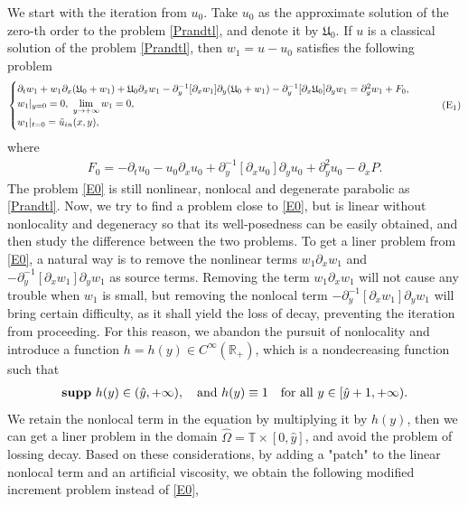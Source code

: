 \documentclass{amsart}
\numberwithin{equation}{section}
\begin{document}
We start with the iteration from $u_{0}$. Take $u_{0}$ as the approximate solution of the zero-th order to the problem \eqref{Prandtl}, and denote it by $\mathfrak{U}_{0}$. If $u$ is a classical solution of the problem \eqref{Prandtl}, then $w_{1}=u-u_{0}$ satisfies the following problem
\begin{equation}\label{E0}
\begin{cases}
\partial_{t}w_{1}
+w_{1}\partial_{x}(\mathfrak{U}_{0}+w_{1})
+\mathfrak{U}_{0}\partial_{x}w_{1}
-\partial_{y}^{-1}[\partial_{x}w_{1}]\partial_{y}(\mathfrak{U}_{0}+w_{1})
-\partial_{y}^{-1}[\partial_{x}\mathfrak{U}_{0}]\partial_{y}w_{1}
=\partial_{y}^{2}w_{1}
+F_{0},\\
w_{1}|_{y=0}=0,~\lim\limits_{y\to+\infty} w_{1}=0,\\
w_{1}|_{t=0}=\tilde{u}_{in}(x,y),
\end{cases}\tag{E$_{1}$}
\end{equation}
where
\begin{align}\label{F0}
F_{0}
=-\partial_{t}u_{0}
 -u_{0}\partial_{x}u_{0}
 +\partial_{y}^{-1}[\partial_{x}u_{0}]\partial_{y}u_{0}
 +\partial_{y}^{2}u_{0}
 -\partial_{x}P.
\end{align}
The problem \eqref{E0} is still nonlinear, nonlocal and degenerate parabolic as \eqref{Prandtl}. Now, we try to find a problem close to \eqref{E0}, but is linear without nonlocality and degeneracy so that its well-posedness can be easily obtained, and then study the difference between the two problems.
To get a liner problem from \eqref{E0}, a natural way is to remove the nonlinear terms  $w_{1}\partial_{x}w_{1}$ and $-\partial_{y}^{-1}[\partial_{x}w_{1}]\partial_{y}w_{1}$ as source terms. Removing the term $w_{1}\partial_{x}w_{1}$ will not cause any trouble when $w_1$ is small, but removing the nonlocal term $-\partial_{y}^{-1}[\partial_{x}w_{1}]\partial_{y}w_{1}$ will bring certain difficulty, as it shall yield the loss of decay, preventing the iteration from proceeding. For this reason, we abandon the pursuit of nonlocality and introduce a function $h=h(y)\in C^{\infty}(\mathbb{R}_{+})$, which is a nondecreasing function such that
\begin{align}\label{h}
{\bf supp}~h(y)\in(\hat{y},+\infty), \quad\text{and}~h(y)\equiv1 \quad {\rm for~all}~ y\in[\hat{y}+1,+\infty).
\end{align}
We retain the nonlocal term in the equation by multiplying it by $h(y)$, then we can get a liner problem in the domain $\hat{\Omega}=\mathbb{T}\times[0,\hat{y}]$,   and avoid the problem of lossing decay. Based on these considerations, by adding a "patch" to the linear nonlocal term and an artificial viscosity, we obtain the following modified increment problem instead of \eqref{E0},
\end{document}
